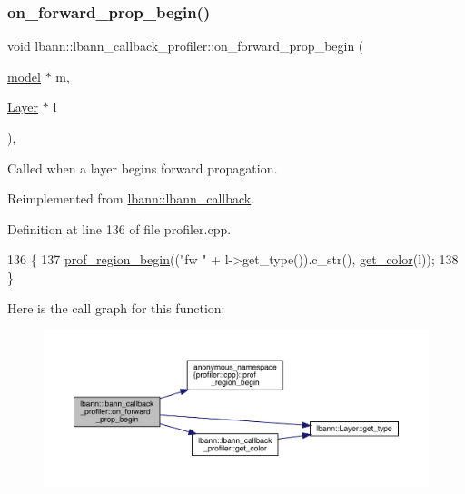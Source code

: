 \subsubsection{\texorpdfstring{on\+\_\+forward\+\_\+prop\+\_\+begin()}{on\_forward\_prop\_begin()}\hspace{0.1cm}{\footnotesize\ttfamily [2/2]}}
{\footnotesize\ttfamily void lbann\+::lbann\+\_\+callback\+\_\+profiler\+::on\+\_\+forward\+\_\+prop\+\_\+begin (\begin{DoxyParamCaption}\item[{\hyperlink{classlbann_1_1model}{model} $\ast$}]{m,  }\item[{\hyperlink{classlbann_1_1Layer}{Layer} $\ast$}]{l }\end{DoxyParamCaption})\hspace{0.3cm}{\ttfamily [override]}, {\ttfamily [virtual]}}

Called when a layer begins forward propagation. 

Reimplemented from \hyperlink{classlbann_1_1lbann__callback_ab96adb1d77180e00fdd668cd381323fd}{lbann\+::lbann\+\_\+callback}.



Definition at line 136 of file profiler.\+cpp.


\begin{DoxyCode}
136                                                                       \{
137   \hyperlink{namespaceanonymous__namespace_02profiler_8cpp_03_ad2ea0278cd1f25dc30ddd76194ace64b}{prof\_region\_begin}((\textcolor{stringliteral}{"fw "} + l->get\_type()).c\_str(), \hyperlink{classlbann_1_1lbann__callback__profiler_af78237a67eaacf2508f31ad72b8ff8a7}{get\_color}(l));  
138 \}
\end{DoxyCode}
Here is the call graph for this function\+:\nopagebreak
\begin{figure}[H]
\begin{center}
\leavevmode
\includegraphics[width=350pt]{classlbann_1_1lbann__callback__profiler_adc7cf77381bec8ab1cc5ba5e554ec268_cgraph}
\end{center}
\end{figure}
\mbox{\label{classlbann_1_1lbann__callback__profiler_a63e3ad301cf8529acda00ac8f2531c93}} 
